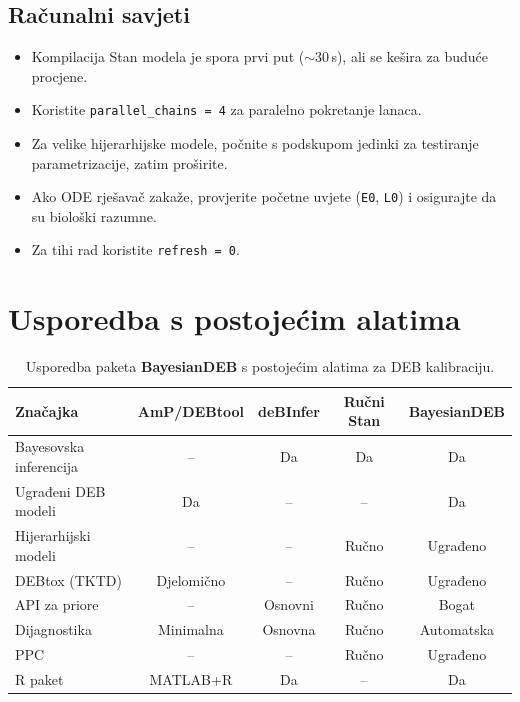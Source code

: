 \documentclass[11pt,a4paper]{article}
\newcommand{\pkg}[1]{\textbf{#1}}
\newcommand{\code}[1]{\texttt{#1}}
\newcommand{\R}{\textsf{R}}
\begin{document}
\subsection{Računalni savjeti}

\begin{itemize}[nosep]
  \item Kompilacija Stan modela je spora prvi put ($\sim$30\,s), ali se
    kešira za buduće procjene.
  \item Koristite \code{parallel\_chains = 4} za paralelno pokretanje
    lanaca.
  \item Za velike hijerarhijske modele, počnite s podskupom jedinki za
    testiranje parametrizacije, zatim proširite.
  \item Ako ODE rješavač zakaže, provjerite početne uvjete (\code{E0},
    \code{L0}) i osigurajte da su biološki razumne.
  \item Za tihi rad koristite \code{refresh = 0}.
\end{itemize}


\section{Usporedba s postojećim alatima}
\label{sec:usporedba}

\begin{table}[htbp]
\centering
\caption{Usporedba paketa \pkg{BayesianDEB} s postojećim alatima za DEB kalibraciju.}
\label{tab:usporedba}
\begin{tabular}{lcccc}
\toprule
\textbf{Značajka} & \textbf{AmP/DEBtool} & \textbf{deBInfer} & \textbf{Ručni Stan} & \textbf{BayesianDEB} \\
\midrule
Bayesovska inferencija      & --          & Da  & Da  & Da \\
Ugrađeni DEB modeli         & Da          & --  & --  & Da \\
Hijerarhijski modeli        & --          & --  & Ručno & Ugrađeno \\
DEBtox (TKTD)               & Djelomično  & --  & Ručno & Ugrađeno \\
API za priore               & --          & Osnovni & Ručno & Bogat \\
Dijagnostika                & Minimalna   & Osnovna & Ručno & Automatska \\
PPC                         & --          & --  & Ručno & Ugrađeno \\
\R{} paket                  & MATLAB+\R{} & Da  & --  & Da \\
\bottomrule
\end{tabular}
\end{table}
\end{document}
